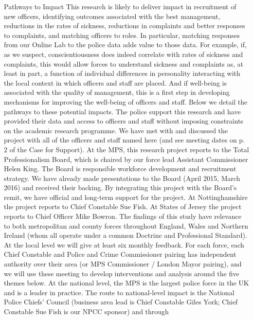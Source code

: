 \documentclass[11pt, a4paper]{article}
\begin{document}
Pathways to Impact
This research is likely to deliver impact in recruitment of new officers, identifying outcomes
associated with the best management, reductions in the rates of sickness, reductions in
complaints and better responses to complaints, and matching officers to roles. In particular,
matching responses from our Online Lab to the police data adds value to those data. For
example, if, as we suspect, conscientiousness does indeed correlate with rates of sickness
and complaints, this would allow forces to understand sickness and complaints as, at least in
part, a function of individual differences in personality interacting with the local context in
which officers and staff are placed. And if well-being is associated with the quality of
management, this is a first step in developing mechanisms for improving the well-being of
officers and staff. Below we detail the pathways to these potential impacts.
The police support this research and have provided their data and access to officers and
staff without imposing constraints on the academic research programme. We have met with
and discussed the project with all of the officers and staff named here (and see meeting
dates on p. 2 of the Case for Support). At the MPS, this research project reports to the Total
Professionalism Board, which is chaired by our force lead Assistant Commissioner Helen
King. The Board is responsible workforce development and recruitment strategy. We have
already made presentations to the Board (April 2015, March 2016) and received their
backing. By integrating this project with the Board’s remit, we have official and long-term
support for the project. At Nottinghamshire the project reports to Chief Constable Sue Fish.
At States of Jersey the project reports to Chief Officer Mike Bowron.
The findings of this study have relevance to both metropolitan and county forces throughout
England, Wales and Northern Ireland (whom all operate under a common Doctrine and
Professional Standard). At the local level we will give at least six monthly feedback. For each
force, each Chief Constable and Police and Crime Commissioner pairing has independent
authority over their area (or MPS Commissioner / London Mayor pairing), and we will use
these meeting to develop interventions and analysis around the five themes below. At the
national level, the MPS is the largest police force in the UK and is a leader in practice. The
route to national-level impact is the National Police Chiefs’ Council (business area lead is
Chief Constable Giles York; Chief Constable Sue Fish is our NPCC sponsor) and through
\end{document}
